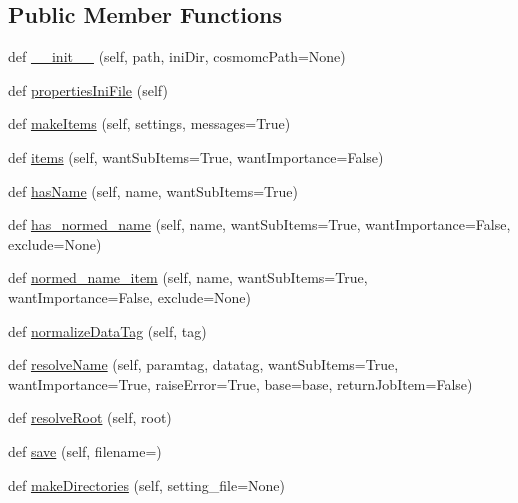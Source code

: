 \subsection*{Public Member Functions}
\begin{DoxyCompactItemize}
\item 
def \mbox{\hyperlink{classparamgrid_1_1batchjob_1_1batchJob_a83638ae47c7522ac0b8d4ee9e1007b78}{\+\_\+\+\_\+init\+\_\+\+\_\+}} (self, path, ini\+Dir, cosmomc\+Path=None)
\item 
def \mbox{\hyperlink{classparamgrid_1_1batchjob_1_1batchJob_ab8e3d7402e50140b05dff9d3004d90a1}{properties\+Ini\+File}} (self)
\item 
def \mbox{\hyperlink{classparamgrid_1_1batchjob_1_1batchJob_a6285bac486b704b012f454c29ab88595}{make\+Items}} (self, settings, messages=True)
\item 
def \mbox{\hyperlink{classparamgrid_1_1batchjob_1_1batchJob_a00d5bd2488a8806f4fb864d54fe01a7e}{items}} (self, want\+Sub\+Items=True, want\+Importance=False)
\item 
def \mbox{\hyperlink{classparamgrid_1_1batchjob_1_1batchJob_a51f5136c448e61a252384d376d57796e}{has\+Name}} (self, name, want\+Sub\+Items=True)
\item 
def \mbox{\hyperlink{classparamgrid_1_1batchjob_1_1batchJob_a6110e6b6926e033a773d799e35e1ba68}{has\+\_\+normed\+\_\+name}} (self, name, want\+Sub\+Items=True, want\+Importance=False, exclude=None)
\item 
def \mbox{\hyperlink{classparamgrid_1_1batchjob_1_1batchJob_addf95d44a88f0ec1a4cfaaa7fae91694}{normed\+\_\+name\+\_\+item}} (self, name, want\+Sub\+Items=True, want\+Importance=False, exclude=None)
\item 
def \mbox{\hyperlink{classparamgrid_1_1batchjob_1_1batchJob_ac738cf079fd0567111d2ce1e591ff2f5}{normalize\+Data\+Tag}} (self, tag)
\item 
def \mbox{\hyperlink{classparamgrid_1_1batchjob_1_1batchJob_ac178cba753c0e34bf0402ed35db56f51}{resolve\+Name}} (self, paramtag, datatag, want\+Sub\+Items=True, want\+Importance=True, raise\+Error=True, base=\textquotesingle{}base\textquotesingle{}, return\+Job\+Item=False)
\item 
def \mbox{\hyperlink{classparamgrid_1_1batchjob_1_1batchJob_aa8a343f42f15d9546b5de3a46fbd53e1}{resolve\+Root}} (self, root)
\item 
def \mbox{\hyperlink{classparamgrid_1_1batchjob_1_1batchJob_af3737431072a9241a150256245c9bd0d}{save}} (self, filename=\textquotesingle{}\textquotesingle{})
\item 
def \mbox{\hyperlink{classparamgrid_1_1batchjob_1_1batchJob_a57b86d97815822c389607772822f7e93}{make\+Directories}} (self, setting\+\_\+file=None)
\end{DoxyCompactItemize}
